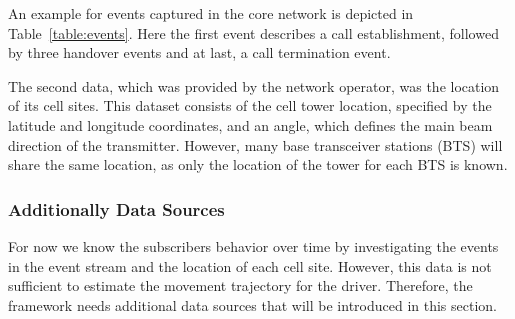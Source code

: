 \documentclass[twocolumn]{bmcart}%
\begin{document}
An example for events captured in the core network is depicted in Table~\ref{table:events}. Here the first event describes a call establishment, followed by three handover events and at last, a call termination event. 
\newline
%
%
%

The second data, which was provided by the network operator, was the location of its cell sites. This dataset consists of the cell tower location, specified by the latitude and longitude coordinates, and an angle, which defines the main beam direction of the transmitter. However, many base transceiver stations (BTS) will share the same location, as only the location of the tower for each BTS is known.

\subsubsection*{Additionally Data Sources}
For now we know the subscribers behavior over time by investigating the events in the event stream and the location of each cell site. However, this data is not sufficient to estimate the movement trajectory for the driver. Therefore, the framework needs additional data sources that will be introduced in this section.
\end{document}
